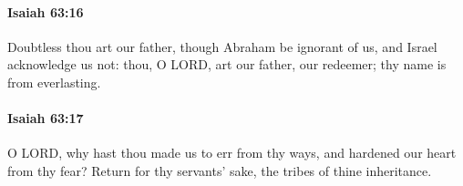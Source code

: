 		\paragraph{Isaiah 63:16} %
			\label{ISAIAH-63-16}

			Doubtless thou art our father, though Abraham be ignorant of us, and Israel acknowledge us not: thou, O LORD, art our father, our redeemer; thy name is from everlasting.


		\paragraph{Isaiah 63:17} %
			\label{ISAIAH-63-17}

			O LORD, why hast thou made us to err from thy ways, and hardened our heart from thy fear? Return for thy servants' sake, the tribes of thine inheritance.


